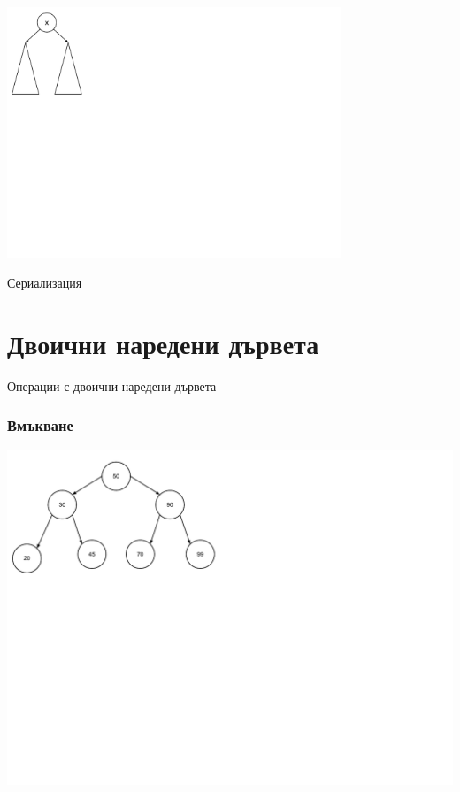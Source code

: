\documentclass{beamer}
\begin{document}
\begin{frame}
\begin{center}
   \includegraphics[width=10cm]{images/tree_recursive}
\end{center}

\vspace{-200px}
\centerline{Сериализация}
 

\end{frame} 

\section{Двоични наредени дървета} 



\begin{frame}
\centerline{Операции с двоични наредени дървета}
\end{frame}


\begin{frame}[fragile]
\frametitle{Вмъкване}

\includegraphics[width=14cm]{images/tree_bot_clean}

\end{frame}
\end{document}
